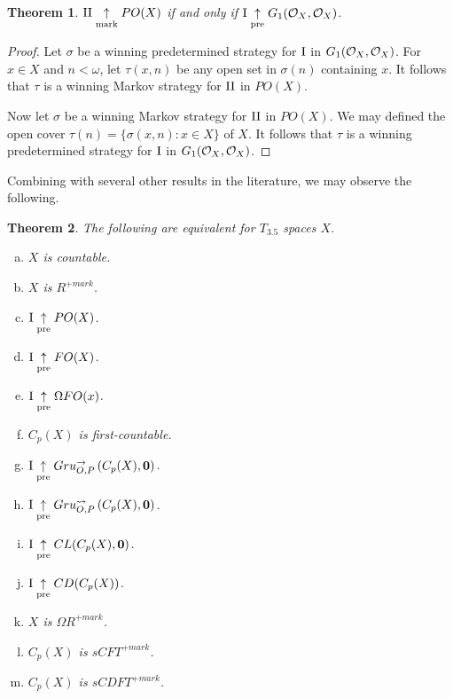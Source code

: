 \documentclass[11pt]{article}
\theoremstyle{plain}
\newtheorem{theorem}{Theorem}
\theoremstyle{definition}
\theoremstyle{remark}
\theoremstyle{plain}
\theoremstyle{definition}
\theoremstyle{remark}
\begin{document}
\begin{theorem}
\(\mathrm{II}\underset{\text{mark}}{\uparrow} PO(X)\) if and only if \(\mathrm{I}\underset{\text{pre}}{\uparrow}G_1(\mathcal{O}_{X},\mathcal{O}_{X})\).
\end{theorem}
\begin{proof}
Let \(\sigma\) be a winning predetermined strategy for \(\mathrm{I}\) in \(G_1(\mathcal{O}_{X},\mathcal{O}_{X})\).
For \(x\in X\) and \(n<\omega\), let \(\tau(x,n)\) be any open set in \(\sigma(n)\)
containing \(x\). It follows that \(\tau\) is a winning Markov strategy for
\(\mathrm{II}\) in \(PO(X)\).

Now let \(\sigma\) be a winning Markov strategy for \(\mathrm{II}\) in \(PO(X)\).
We may defined the open cover \(\tau(n)=\{\sigma(x,n):x\in X\}\) of \(X\).
It follows that \(\tau\) is a winning predetermined strategy for \(\mathrm{I}\)
in \(G_1(\mathcal{O}_{X},\mathcal{O}_{X})\).
\end{proof}


Combining with several other results in the literature,
we may observe the following.

\begin{theorem}
The following are equivalent for \(T_{3.5}\) spaces \(X\).
\begin{enumerate}[a)]
\item \(X\) is countable.
\item \(X\) is \(R^{+mark}\).
\item \(\mathrm{I}\underset{\text{pre}}{\uparrow} PO(X)\). 
\item \(\mathrm{I}\underset{\text{pre}}{\uparrow} FO(X)\).
\item \(\mathrm{I}\underset{\text{pre}}{\uparrow}\Omega FO(x)\).
\item \(C_p(X)\) is first-countable.
\item \(\mathrm{I}\underset{\text{pre}}{\uparrow} Gru_{O,P}^{\to}\left({C_p(X)},{\mathbf 0}\right)\).
\item \(\mathrm{I}\underset{\text{pre}}{\uparrow} Gru_{O,P}^{\leadsto}\left({C_p(X)},{\mathbf 0}\right)\).
\item \(\mathrm{I}\underset{\text{pre}}{\uparrow} CL(C_p(X),\mathbf 0)\).
\item \(\mathrm{I}\underset{\text{pre}}{\uparrow} CD(C_p(X))\).
\item \(X\) is \(\Omega R^{+mark}\).
\item \(C_p(X)\) is \(sCFT^{+mark}\).
\item \(C_p(X)\) is \(sCDFT^{+mark}\).
\end{enumerate}
\end{theorem}
\end{document}
